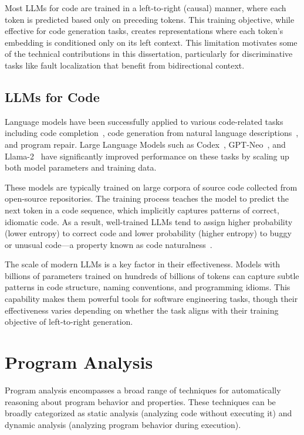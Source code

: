 \documentclass[12pt,openany,oneside,table]{cmuthesis}
\begin{document}
Most LLMs for code are trained in a left-to-right (causal) manner, where each token is predicted based only on preceding tokens. This training objective, while effective for code generation tasks, creates representations where each token's embedding is conditioned only on its left context. This limitation motivates some of the technical contributions in this dissertation, particularly for discriminative tasks like fault localization that benefit from bidirectional context.

\subsection{LLMs for Code}

Language models have been successfully applied to various code-related tasks including code completion~\cite{desai2016program, inCoder}, code generation from natural language descriptions~\cite{raychev2014code}, and program repair. Large Language Models such as Codex~\cite{Codex}, GPT-Neo~\cite{Neox}, and Llama-2~\cite{Llama} have significantly improved performance on these tasks by scaling up both model parameters and training data.

These models are typically trained on large corpora of source code collected from open-source repositories. The training process teaches the model to predict the next token in a code sequence, which implicitly captures patterns of correct, idiomatic code. As a result, well-trained LLMs tend to assign higher probability (lower entropy) to correct code and lower probability (higher entropy) to buggy or unusual code—a property known as code naturalness~\cite{NAT, hindle2016naturalness}.

The scale of modern LLMs is a key factor in their effectiveness. Models with billions of parameters trained on hundreds of billions of tokens can capture subtle patterns in code structure, naming conventions, and programming idioms. This capability makes them powerful tools for software engineering tasks, though their effectiveness varies depending on whether the task aligns with their training objective of left-to-right generation.

\section{Program Analysis}

Program analysis encompasses a broad range of techniques for automatically reasoning about program behavior and properties. These techniques can be broadly categorized as static analysis (analyzing code without executing it) and dynamic analysis (analyzing program behavior during execution).
\end{document}
